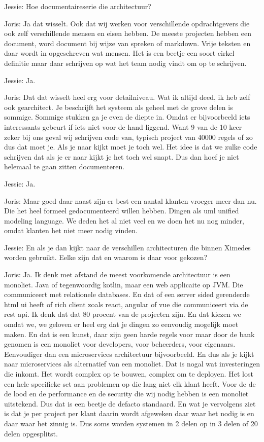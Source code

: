 Jessie: Hoe documentaireserie die architectuur?

Joris: Ja dat wisselt. Ook dat wij werken voor verschillende opdrachtgevers die ook zelf verschillende mensen en eisen hebben. De meeste projecten hebben een document, word document bij wijze van spreken of markdown. Vrije teksten en daar wordt in opgeschreven wat mensen. Het is een beetje een soort cirkel definitie maar daar schrijven op wat het team nodig vindt om op te schrijven.

Jessie: Ja.

Joris: Dat dat wisselt heel erg voor detailniveau. Wat ik altijd deed, ik heb zelf ook gearchitect. Je beschrijft het systeem als geheel met de grove delen is sommige. Sommige stukken ga je even de diepte in. Omdat er bijvoorbeeld iets interessants gebeurt if iets niet voor de hand liggend. Want 9 van de 10 keer zeker bij ons geval wij schrijven code van, typisch project van 40000 regels of zo dus dat moet je. Als je naar kijkt moet je toch wel. Het idee is dat we zulke code schrijven dat als je er naar kijkt je het toch wel snapt. Dus dan hoef je niet helemaal te gaan zitten documenteren.

Jessie: Ja.

Joris: Maar goed daar naast zijn er best een aantal klanten vroeger meer dan nu. Die het heel formeel gedocumenteerd willen hebben. Dingen als uml unified modeling language. We deden het al niet veel en we doen het nu nog minder, omdat klanten het niet meer nodig vinden.

Jessie: En als je dan kijkt naar de verschillen architecturen die binnen Ximedes worden gebruikt. Eelke zijn dat en waarom is daar voor gekozen?

Joris: Ja. Ik denk met afstand de meest voorkomende architectuur is een monoliet. Java of tegenwoordig kotlin, maar een web applicaite op JVM. Die communiceert met relationele databases. En dat of een server sided gerenderde html ui heeft of rich client zoals react, angular of vue die communiceert via de rest api. Ik denk dat dat 80 procent van de projecten zijn. En dat kiezen we omdat we, we geloven er heel erg dat je dingen zo eenvoudig mogelijk moet maken. En dat is een kunst, daar zijn geen harde regels voor maar door de bank genomen is een monoliet voor developers, voor beheerders, voor eigenaars. Eenvoudiger dan een microservices architectuur bijvoorbeeld. En dus als je kijkt naar microservices als alternatief van een monoliet. Dat is nogal wat investeringen die inkomt. Het wordt complex op te bouwen, complex om te deployen. Het lost een hele specifieke set aan problemen op die lang niet elk klant heeft. Voor de de de lood en de performance en de security die wij nodig hebben is een monoliet uitstekend. Dus dat is een beetje de defacto standaard. En wat je vervolgens ziet is dat je per project per klant daarin wordt afgeweken daar waar het nodig is en daar waar het zinnig is. Dus soms worden systemen in 2 delen op in 3 delen of 20 delen opgesplitst.

